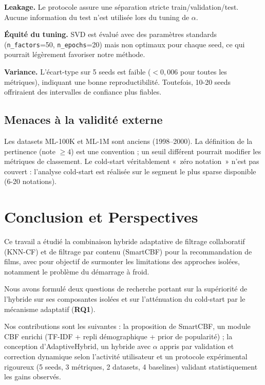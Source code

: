 \documentclass[conference]{IEEEtran}
\newcommand{\RQ}[1]{\textbf{RQ#1}}
\begin{document}
\textbf{Leakage.} Le protocole assure une séparation stricte train/validation/test.
Aucune information du test n'est utilisée lors du tuning de $\alpha$.

\textbf{Équité du tuning.} SVD est évalué avec des paramètres standards
(\texttt{n\_factors}=50, \texttt{n\_epochs}=20) mais non optimaux pour chaque
seed, ce qui pourrait légèrement favoriser notre méthode.

\textbf{Variance.} L'écart-type sur 5 seeds est faible ($< 0{,}006$ pour
toutes les métriques), indiquant une bonne reproductibilité. Toutefois, 10-20
seeds offriraient des intervalles de confiance plus fiables.

\subsection{Menaces à la validité externe}

Les datasets ML-100K et ML-1M sont anciens (1998--2000). La définition de la
pertinence (note $\geq 4$) est une convention ; un seuil différent pourrait
modifier les métriques de classement. Le cold-start véritablement
«~zéro notation~» n'est pas couvert : l'analyse cold-start est réalisée sur le
segment le plus sparse disponible (6-20 notations).



\section{Conclusion et Perspectives}
\label{sec:conclusion}

Ce travail a étudié la combinaison hybride adaptative de filtrage collaboratif
(KNN-CF) et de filtrage par contenu (SmartCBF) pour la recommandation de films,
avec pour objectif de surmonter les limitations des approches isolées,
notamment le problème du démarrage à froid.

Nous avons formulé deux questions de recherche portant sur la supériorité de
l'hybride sur ses composantes isolées et sur l'atténuation du
cold-start par le mécanisme adaptatif (\RQ{1}).

Nos contributions sont les suivantes : la proposition de SmartCBF, un
module CBF enrichi (TF-IDF + repli démographique + prior de popularité) ;
la conception d'AdaptiveHybrid, un hybride avec $\alpha$ appris par
validation et correction dynamique selon l'activité utilisateur et un
protocole expérimental rigoureux (5 seeds, 3 métriques, 2 datasets, 4
baselines) validant statistiquement les gains observés.
\end{document}

